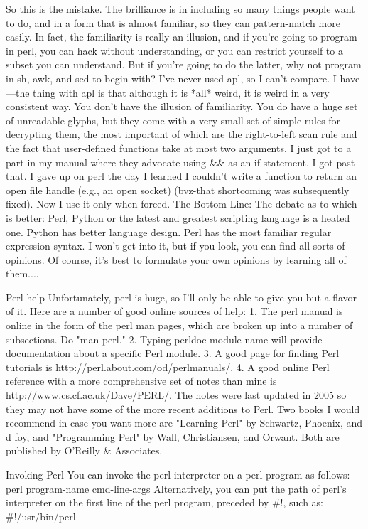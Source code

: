 So this is the mistake. The brilliance is in including so many things people want to do, and in a form that is almost familiar, so they can pattern-match more easily. In fact, the familiarity is really an illusion, and if you're going to program in perl, you can hack without understanding, or you can restrict yourself to a subset you can understand. But if you're going to do the latter, why not program in sh, awk, and sed to begin with? 
I've never used apl, so I can't compare. 
I have---the thing with apl is that although it is *all* weird, it is weird in a very consistent way. You don't have the illusion of familiarity. You do have a huge set of unreadable glyphs, but they come with a very small set of simple rules for decrypting them, the most important of which are the right-to-left scan rule and the fact that user-defined functions take at most two arguments. 
I just got to a part in my manual where they advocate using && as an if statement. 
I got past that. I gave up on perl the day I learned I couldn't write a function to return an open file handle (e.g., an open socket) (bvz-that shortcoming was subsequently fixed). Now I use it only when forced. 
The Bottom Line: The debate as to which is better: Perl, Python or the latest and greatest scripting language is a heated one. Python has better language design. Perl has the most familiar regular expression syntax. I won't get into it, but if you look, you can find all sorts of opinions. Of course, it's best to formulate your own opinions by learning all of them.... 

Perl help
Unfortunately, perl is huge, so I'll only be able to give you but a flavor of it. Here are a number of good online sources of help: 
1. The perl manual is online in the form of the perl man pages, which are broken up into a number of subsections. Do "man perl." 
2. Typing perldoc module-name will provide documentation about a specific Perl module. 
3. A good page for finding Perl tutorials is http://perl.about.com/od/perlmanuals/. 
4. A good online Perl reference with a more comprehensive set of notes than mine is http://www.cs.cf.ac.uk/Dave/PERL/. The notes were last updated in 2005 so they may not have some of the more recent additions to Perl. 
Two books I would recommend in case you want more are "Learning Perl" by Schwartz, Phoenix, and d foy, and "Programming Perl" by Wall, Christiansen, and Orwant. Both are published by O'Reilly & Associates. 

Invoking Perl
You can invoke the perl interpreter on a perl program as follows: 
perl program-name cmd-line-args
Alternatively, you can put the path of perl's interpreter on the first line of the perl program, preceded by #!, such as: 
#!/usr/bin/perl

